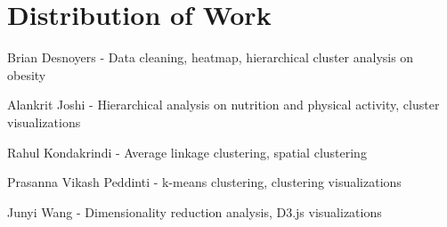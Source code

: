 \documentclass{article}
\begin{document}
\section{Distribution of Work}
\label{distribution}

Brian Desnoyers - Data cleaning, heatmap, hierarchical cluster analysis on obesity

Alankrit Joshi - Hierarchical analysis on nutrition and physical activity, cluster visualizations

Rahul Kondakrindi - Average linkage clustering, spatial clustering

Prasanna Vikash Peddinti - k-means clustering, clustering visualizations

Junyi Wang - Dimensionality reduction analysis, D3.js visualizations




\end{document}
